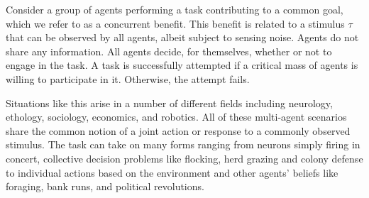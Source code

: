 \documentclass[12pt]{article}
\begin{document}


Consider a group of agents performing a task contributing to a common goal, which we refer to as a concurrent benefit. This benefit is related to a stimulus $\tau$ that can be observed by all agents, albeit subject to sensing noise. Agents do not share any information. All agents decide, for themselves, whether or not to engage in the task. A task is successfully attempted if a critical mass of agents is willing to participate in it. Otherwise, the attempt fails.

Situations like this arise in a number of different fields including neurology\cite{Yoshida2010, Suzuki2015}, ethology\cite{Robinson1987, Gordon1996, Bonabeau1998, Theraulaz1998}, sociology\cite{Raafat2009}, economics\cite{Morris2000}, and robotics\cite{Martinoli1999, Krieger2000, Kube2000, Pynadath2002, Gerkey2003, Mataric2003, Gerkey2004, Kanakia2014}. All of these multi-agent scenarios share the common notion of a joint action or response to a commonly observed stimulus. The task can take on many forms ranging from neurons simply firing in concert, collective decision problems like flocking, herd grazing and colony defense to individual actions based on the environment and other agents' beliefs like foraging, bank runs, and political revolutions. 
\end{document}
